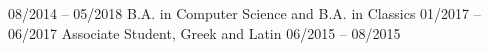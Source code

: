 
\begin{entrylist}
	\smallentry
		{08/2014 -- 05/2018}
   		{B.A. in Computer Science and B.A. in Classics}
		{\grinnell}
	\smallentry
		{01/2017 -- 06/2017}
    		{Associate Student, Greek and Latin}
    		{\ucl}
	\smallentry
		{06/2015 -- 08/2015}
    		{}
    		{\berkeley}
\end{entrylist}